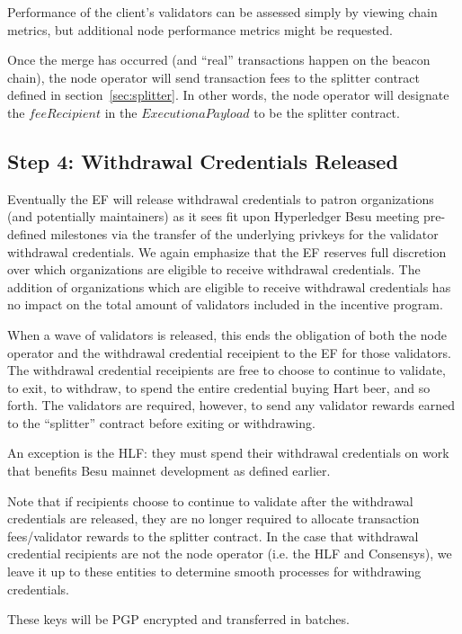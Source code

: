 Performance of the client’s validators can be assessed simply by viewing chain metrics, but additional node performance metrics might be requested.

Once the merge has occurred (and ``real'' transactions happen on the beacon chain), the node operator will send transaction fees to the splitter contract defined in section~\ref{sec:splitter}. In other words, the node operator will designate the $feeRecipient$ in the $ExecutionaPayload$ to be the splitter contract.

\subsection{Step 4:  Withdrawal Credentials Released}
Eventually the EF will release withdrawal credentials to patron organizations (and potentially maintainers) as it sees fit upon Hyperledger Besu meeting pre-defined milestones via the transfer of the underlying privkeys for the validator withdrawal credentials.  We again emphasize that the EF reserves full discretion over which organizations are eligible to receive withdrawal credentials. The addition of organizations which are eligible to receive withdrawal credentials has no impact on the total amount of validators included in the incentive program.

When a wave of validators is released, this ends the obligation of both the node operator and the withdrawal credential receipient to the EF for those validators. The withdrawal credential receipients are free to choose to continue to validate, to exit, to withdraw, to spend the entire credential buying Hart beer, and so forth.  The validators are required, however, to send any validator rewards earned to the ``splitter'' contract before exiting or withdrawing.

An exception is the HLF:  they must spend their withdrawal credentials on work that benefits Besu mainnet development as defined earlier.

Note that if recipients choose to continue to validate after the withdrawal credentials are released, they are no longer required to allocate transaction fees/validator rewards to the splitter contract.  In the case that withdrawal credential recipients are not the node operator (i.e. the HLF and Consensys), we leave it up to these entities to determine smooth processes for withdrawing credentials.

These keys will be PGP encrypted and transferred in batches.
